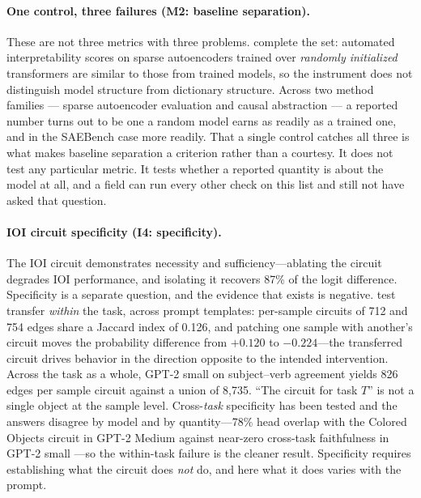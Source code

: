 \documentclass{article}
\begin{document}
\paragraph{One control, three failures (M2: baseline separation).}
These are not three metrics with three problems. \citet{heap2025sparse} complete the set:
automated interpretability scores on sparse autoencoders trained over \emph{randomly
initialized} transformers are similar to those from trained models, so the instrument does
not distinguish model structure from dictionary structure. Across two method families ---
sparse autoencoder evaluation and causal abstraction --- a reported number turns out to be
one a random model earns as readily as a trained one, and in the SAEBench case more
readily. That a single control catches all three is what makes baseline separation a
criterion rather than a courtesy. It does not test any particular metric. It tests whether
a reported quantity is about the model at all, and a field can run every other check on
this list and still not have asked that question.

\paragraph{IOI circuit specificity (I4: specificity).}
The IOI circuit \citep{wang2023interpretability} demonstrates necessity and sufficiency---ablating the circuit degrades IOI performance, and isolating it recovers 87\% of the logit difference. Specificity is a separate question, and the evidence that exists is negative. \citet{wu2026demystifying} test transfer \emph{within} the task, across prompt templates: per-sample circuits of 712 and 754 edges share a Jaccard index of 0.126, and patching one sample with another's circuit moves the probability difference from $+0.120$ to $-0.224$---the transferred circuit drives behavior in the direction opposite to the intended intervention. Across the task as a whole, GPT-2 small on subject--verb agreement yields 826 edges per sample circuit against a union of 8{,}735. ``The circuit for task $T$'' is not a single object at the sample level. Cross-\emph{task} specificity has been tested and the answers disagree by model and by quantity---78\% head overlap with the Colored Objects circuit in GPT-2 Medium \citep{merullo2024circuit} against near-zero cross-task faithfulness in GPT-2 small \citep{hanna2024faith}---so the within-task failure is the cleaner result. Specificity requires establishing what the circuit does \emph{not} do, and here what it does varies with the prompt.
\end{document}
